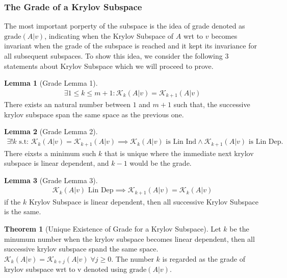 \documentclass[]{article}
\theoremstyle{definition}
\newtheorem{theorem}{Theorem}            %
\newtheorem{lemma}{Lemma}[subsection]    %
\begin{document}
        \subsubsection{The Grade of a Krylov Subspace}
            The most important porperty of the subspace is the idea of grade denoted as $\text{grade}(A|v)$, indicating when the Krylov Subspace of $A$ wrt to $v$ becomes invariant when the grade of the subspace is reached and it kept its invariance for all subsequent subspaces. To show this idea, we consider the following 3 statements about Krylov Subspace which we will proceed to prove. 
            \begin{lemma}[Grade Lemma 1]
                \begin{align}
                    \exists 1 \le k \le m + 1: \mathcal K_k(A|v) = \mathcal K_{k + 1}(A|v)
                \end{align}
                There exists an natural number between $1$ and $m+ 1$ such that, the successive krylov subspace span the same space as the previous one. 
            \end{lemma} 
            \begin{lemma}[Grade Lemma 2]
                \begin{align}
                    \exists! k \text{ s.t: }\mathcal K_k(A|v) = \mathcal K_{k + 1}(A|v) \implies 
                    \mathcal K_k(A|v) \text{ is Lin Ind} \wedge \mathcal K_{k + 1}(A|v) \text{ is Lin Dep}. 
                \end{align}
                There eixsts a minimum such $k$ that is unique where the immediate next krylov subspace is linear dependent, and $k - 1$ would be the grade. 
            \end{lemma}
            \begin{lemma}[Grade Lemma 3]
                \begin{align}
                    \mathcal K_k(A|v) \text{ Lin Dep} \implies \mathcal K_{k + 1}(A|v) = \mathcal K_k(A|v)
                \end{align}
                if the $k$ Krylov Subspace is linear dependent, then all successive Krylov Subspace is the same. 
            \end{lemma}
            \begin{theorem}[Unique Existence of Grade for a Krylov Subspace]
                \label{theorem:Existence_of_Grade_for_a_Krylov_Subspace}
                Let $k$ be the minumum number when the krylov subspace becomes linear dependent, then all successive krylov subspace spand the same space. $\mathcal K_k(A|v) = \mathcal K_{k + j}(A|v) \;\forall j \ge 0$. The number $k$ is regarded as the grade of krylov subspace wrt to v denoted using $\text{grade}(A|v)$. 
            \end{theorem}
\end{document}
